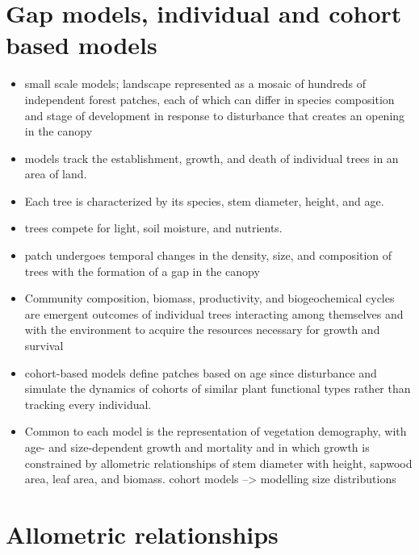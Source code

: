 \documentclass[12pt,oneside]{book}
\begin{document}
\section{Gap models, individual and cohort based
models}\label{gap-models-individual-and-cohort-based-models}

\begin{itemize}
\item
  small scale models; landscape represented as a mosaic of hundreds of
  independent forest patches, each of which can differ in species
  composition and stage of development in response to disturbance that
  creates an opening in the canopy
\item
  models track the establishment, growth, and death of individual trees
  in an area of land.
\item
  Each tree is characterized by its species, stem diameter, height, and
  age.
\item
  trees compete for light, soil moisture, and nutrients.
\item
  patch undergoes temporal changes in the density, size, and composition
  of trees with the formation of a gap in the canopy
\item
  Community composition, biomass, productivity, and biogeochemical
  cycles are emergent outcomes of individual trees interacting among
  themselves and with the environment to acquire the resources necessary
  for growth and survival
\item
  cohort-based models define patches based on age since disturbance and
  simulate the dynamics of cohorts of similar plant functional types
  rather than tracking every individual.
\item
  Common to each model is the representation of vegetation demography,
  with age- and size-dependent growth and mortality and in which growth
  is constrained by allometric relationships of stem diameter with
  height, sapwood area, leaf area, and biomass. cohort models
  --\textgreater{} modelling size distributions
\end{itemize}

\section{Allometric relationships}\label{allometric-relationships}
\end{document}
